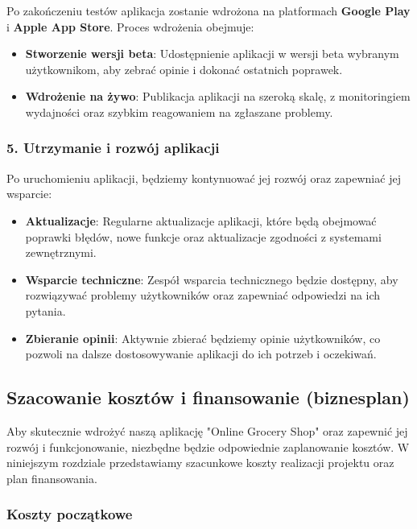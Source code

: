 \documentclass[12pt,a4paper]{article}
\begin{document}
Po zakończeniu testów aplikacja zostanie wdrożona na platformach \textbf{Google Play} i
\textbf{Apple App Store}. Proces wdrożenia obejmuje:
\begin{itemize}
    \item \textbf{Stworzenie wersji beta}: Udostępnienie aplikacji w wersji beta wybranym
        użytkownikom, aby zebrać opinie i dokonać ostatnich poprawek.
    \item \textbf{Wdrożenie na żywo}: Publikacja aplikacji na szeroką skalę, z monitoringiem
        wydajności oraz szybkim reagowaniem na zgłaszane problemy.
\end{itemize}

\subsubsection*{5. Utrzymanie i rozwój aplikacji}

Po uruchomieniu aplikacji, będziemy kontynuować jej rozwój oraz zapewniać jej wsparcie:
\begin{itemize}
    \item \textbf{Aktualizacje}: Regularne aktualizacje aplikacji, które będą obejmować poprawki
        błędów, nowe funkcje oraz aktualizacje zgodności z systemami zewnętrznymi.
    \item \textbf{Wsparcie techniczne}: Zespół wsparcia technicznego będzie dostępny, aby
        rozwiązywać problemy użytkowników oraz zapewniać odpowiedzi na ich pytania.
    \item \textbf{Zbieranie opinii}: Aktywnie zbierać będziemy opinie użytkowników, co pozwoli na
        dalsze dostosowywanie aplikacji do ich potrzeb i oczekiwań.
\end{itemize}

\subsection*{Szacowanie kosztów i finansowanie (biznesplan)}

Aby skutecznie wdrożyć naszą aplikację "Online Grocery Shop" oraz zapewnić jej rozwój i funkcjonowanie, niezbędne będzie odpowiednie zaplanowanie kosztów. W niniejszym rozdziale przedstawiamy szacunkowe koszty realizacji projektu oraz plan finansowania.

\subsubsection*{Koszty początkowe}
\end{document}
